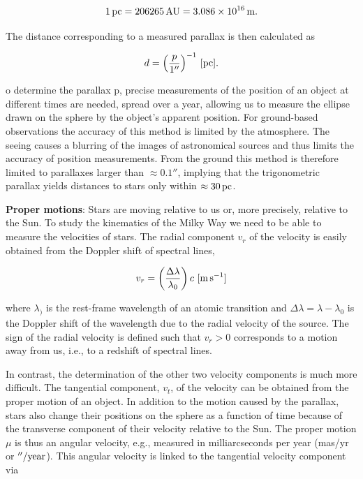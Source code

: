 \documentclass[a4paper,11pt]{article}
\begin{document}
\begin{align*}
    1\,{\rm pc} = 206265\,{\rm AU} = 3.086\times10^{16}\,{\rm m}.
\end{align*}

{\noindent}The distance corresponding to a measured parallax is then
calculated as

\begin{align*}
    d = \left(\frac{p}{1''}\right)^{-1}\,{[\rm pc]}.
\end{align*}

{\noindent}o determine the parallax p, precise measurements of the position of an object at different times are needed, spread over a year, allowing us to measure the ellipse drawn on the sphere by the object’s apparent position. For ground-based observations the accuracy of this method is limited by the atmosphere. The seeing causes a blurring of the images of astronomical sources and thus limits the accuracy of position measurements. From the ground this method is therefore limited to parallaxes larger than $\approx0.1''$, implying that the trigonometric parallax yields distances to stars only within $\approx30\,{\rm pc}$.

{\noindent}\textbf{Proper motions}: Stars are moving relative to us or, more precisely, relative to the Sun. To study the kinematics of the Milky Way we need to be able to measure the velocities of stars. The radial component $v_r$ of the velocity is easily obtained from the Doppler shift of spectral lines,

\begin{align*}
    v_r = \left(\frac{\Delta\lambda}{\lambda_0}\right)c ~ [{\rm m\,s^{-1}}]
\end{align*}

{\noindent}where $\lambda_)$ is the rest-frame wavelength of an atomic transition and $\Delta\lambda=\lambda-\lambda_0$ is the Doppler shift of the wavelength due to the radial velocity of the source. The sign of the radial velocity is defined such that $v_r>0$ corresponds to a motion away from us, i.e., to a redshift of spectral lines.

{\noindent}In contrast, the determination of the other two velocity components is much more difficult. The tangential component, $v_t$, of the velocity can be obtained from the proper motion of an object. In addition to the motion caused by the parallax, stars also change their positions on the sphere as a function of time because of the transverse component of their velocity relative to the Sun. The proper motion $\mu$ is thus an angular velocity, e.g., measured in milliarcseconds per year (mas/yr or $''/{\rm year}$). This angular velocity is linked to the tangential velocity component via
\end{document}
